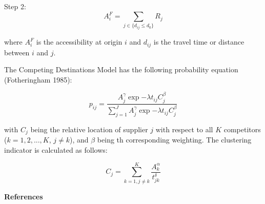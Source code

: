 \documentclass[
]{article}
\begin{document}
Step 2: \[A_i^F = \sum_{j \in \{d_{ij} \leq d_0\}} R_j\]

where \(A_i^F\) is the accessibility at origin \(i\) and \(d_{ij}\) is
the travel time or distance between \(i\) and \(j\).

The Competing Destinations Model has the following probability equation
(Fotheringham 1985):

\[p_{ij} = \frac{A_j^{\gamma} \exp{-\lambda t_{ij}} C_j^{\beta}}{\sum_{j=1}^J A_j^{\gamma} \exp{-\lambda t_{ij}} C_j^{\beta}}\]

with \(C_j\) being the relative location of supplier \(j\) with respect
to all \(K\) competitors (\(k=1,2,...,K\), \(j \neq k\)), and \(\beta\)
being th corresponding weighting. The clustering indicator is calculated
as follows:

\[C_j = \sum_{k=1, j \neq k}^K \frac{A_k^{\alpha}}{t_{jk}^{\delta}}\]

\textbf{References}
\end{document}
